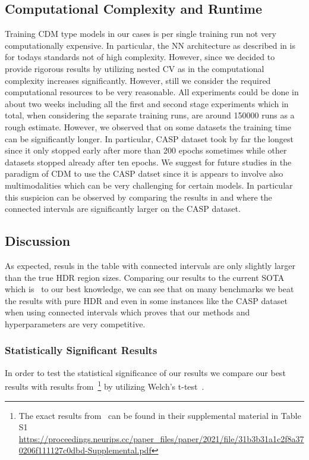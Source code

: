 \subsection{Computational Complexity and Runtime}
Training CDM type models in our cases is per single training run not very computationally expensive. In particular, the NN architecture as described in  is for todays standards not of high complexity. However, since we decided to provide rigorous results by utilizing nested CV as in  the computational complexity increases significantly. However, still we consider the required computational resources to be very reasonable. All experiments could be done in about two weeks including all the first and second stage experiments which in total, when considering the separate training runs, are around 150000 runs as a rough estimate. However, we observed that on some datasets the training time can be significantly longer. In particular, CASP dataset took by far the longest since it only stopped early after more than 200 epochs sometimes while other datasets stopped already after ten epochs. We suggest for future studies in the paradigm of CDM to use the  CASP datset since it is appears to involve also multimodalities which can be very challenging for certain models. In particular this suspicion can be observed by comparing the results in  and  where the connected intervals are significantly larger on the CASP dataset.

\subsection{Discussion}\label{sec:discussion}
As expected, resuls in the table with connected intervals are only slightly larger than the true HDR region sizes. Comparing our results to the current SOTA which is~\cite{sesia2021conformal} to our best knowledge, we can see that on many benchmarks we beat the results with pure HDR and even in some instances like the CASP dataset when using connected intervals which proves that our methods and hyperparameters are very competitive.

\subsubsection{Statistically Significant Results}
In order to test the statistical significance of our results we compare our best results with results from~\cite{sesia2021conformal}\footnote{The exact results from~\cite{sesia2021conformal} can be found in their supplemental material in Table S1 \url{https://proceedings.neurips.cc/paper_files/paper/2021/file/31b3b31a1c2f8a370206f111127c0dbd-Supplemental.pdf}} by utilizing Welch's t-test~\cite{welch1947generalization}.

